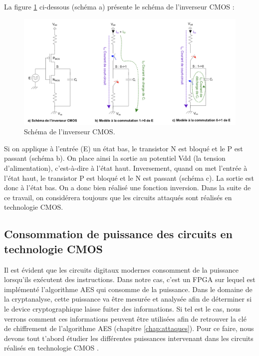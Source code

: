 \documentclass[oneside]{book}
\begin{document}
\hspace{-0.5 cm}La figure \ref{fig:CMOS} ci-dessous (schéma a) présente le schéma de l'inverseur CMOS :
\begin{figure}[htbp]
    \centering
    \includegraphics[scale=0.75]{image/CMOS}
    \caption{Schéma de l'inverseur CMOS.}
    \label{fig:CMOS} 
\end{figure}

Si on applique à l'entrée (E) un état bas, le transistor N est bloqué et le P est passant (schéma b). On place ainsi la sortie au potentiel Vdd (la tension d'alimentation), c'est-à-dire à l'état haut. Inversement, quand on met l'entrée à l'état haut, le transistor P est bloqué et le N est passant (schéma c). La sortie est donc à l'état bas. On a donc bien réalisé une fonction inversion. Dans la suite de ce travail, on considérera toujours que les circuits attaqués sont réalisés en technologie CMOS.


\subsection{Consommation de puissance des circuits en technologie CMOS}
\label{sec:puissance}

Il est évident que les circuits digitaux modernes consomment de la puissance lorsqu'ils exécutent des instructions. Dans notre cas, c'est un FPGA sur lequel est implémenté l'algorithme AES qui consomme de la puissance. Dans le domaine de la cryptanalyse, cette puissance va être mesurée et analysée afin de déterminer si le device cryptographique laisse fuiter des informations. Si tel est le cas, nous verrons comment ces informations peuvent être utilisées afin de retrouver la clé de chiffrement de l'algorithme AES (chapitre \ref{chap:attaques}). Pour ce faire, nous devons tout t'abord étudier les différentes puissances intervenant dans les circuits réalisés en technologie CMOS \cite{mangard_power_2007}.
\end{document}
